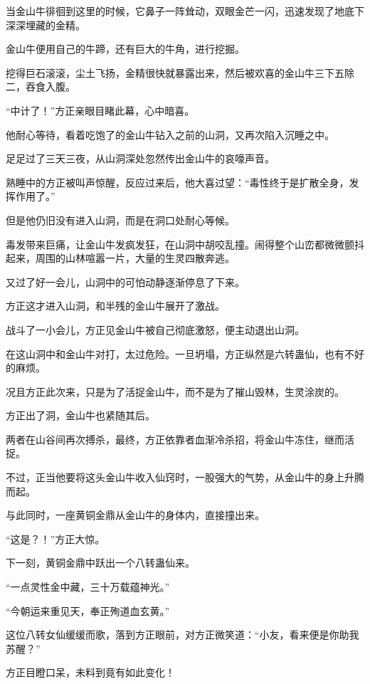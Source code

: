 \begin{this_body}
当金山牛徘徊到这里的时候，它鼻子一阵耸动，双眼金芒一闪，迅速发现了地底下深深埋藏的金精。

金山牛便用自己的牛蹄，还有巨大的牛角，进行挖掘。

挖得巨石滚滚，尘土飞扬，金精很快就暴露出来，然后被欢喜的金山牛三下五除二，吞食入腹。

“中计了！”方正亲眼目睹此幕，心中暗喜。

他耐心等待，看着吃饱了的金山牛钻入之前的山洞，又再次陷入沉睡之中。

足足过了三天三夜，从山洞深处忽然传出金山牛的哀嚎声音。

熟睡中的方正被叫声惊醒，反应过来后，他大喜过望：“毒性终于是扩散全身，发挥作用了。”

但是他仍旧没有进入山洞，而是在洞口处耐心等候。

毒发带来巨痛，让金山牛发疯发狂，在山洞中胡咬乱撞。闹得整个山峦都微微颤抖起来，周围的山林喧嚣一片，大量的生灵四散奔逃。

又过了好一会儿，山洞中的可怕动静逐渐停息了下来。

方正这才进入山洞，和半残的金山牛展开了激战。

战斗了一小会儿，方正见金山牛被自己彻底激怒，便主动退出山洞。

在这山洞中和金山牛对打，太过危险。一旦坍塌，方正纵然是六转蛊仙，也有不好的麻烦。

况且方正此次来，只是为了活捉金山牛，而不是为了摧山毁林，生灵涂炭的。

方正出了洞，金山牛也紧随其后。

两者在山谷间再次搏杀，最终，方正依靠者血渐冷杀招，将金山牛冻住，继而活捉。

不过，正当他要将这头金山牛收入仙窍时，一股强大的气势，从金山牛的身上升腾而起。

与此同时，一座黄铜金鼎从金山牛的身体内，直接撞出来。

“这是？！”方正大惊。

下一刻，黄铜金鼎中跃出一个八转蛊仙来。

“一点灵性金中藏，三十万载蕴神光。”

“今朝运来重见天，奉正殉道血玄黄。”

这位八转女仙缓缓而歌，落到方正眼前，对方正微笑道：“小友，看来便是你助我苏醒？”

方正目瞪口呆，未料到竟有如此变化！

\end{this_body}

